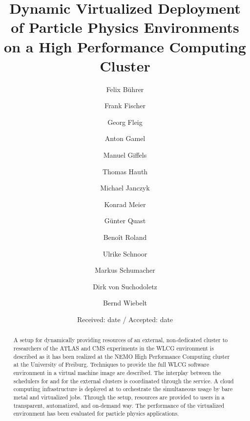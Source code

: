 %


\title{Dynamic Virtualized Deployment of Particle Physics Environments on a
  High Performance Computing Cluster}
%
\author{Felix B\"uhrer \and Frank Fischer \and Georg Fleig \and Anton
  Gamel \and Manuel Giffels \and Thomas Hauth \and Michael Janczyk
  \and Konrad Meier \and
G\"unter Quast \and  Beno\^it Roland  \and Ulrike Schnoor \and
  Markus Schumacher \and Dirk von Suchodoletz \and Bernd Wiebelt
}






\date{Received: date / Accepted: date}


\maketitle

\begin{abstract}

A setup for dynamically providing resources of an external, non-dedicated cluster to researchers of the ATLAS and CMS experiments in the WLCG environment is described as it has been realized at the NEMO High Performance Computing cluster at the University of Freiburg. Techniques to provide the full WLCG software environment in a virtual machine image are described. The interplay
between the
 schedulers for \NEMO and for the external
 clusters is coordinated through the \Roced service.
A cloud computing infrastructure is deployed at \NEMO to orchestrate the
simultaneous usage by bare metal and virtualized jobs.
Through the setup, resources are provided to users in a transparent,
automatized, and
on-demand way. The performance of the virtualized environment has been
evaluated for particle physics applications.



\end{abstract}




